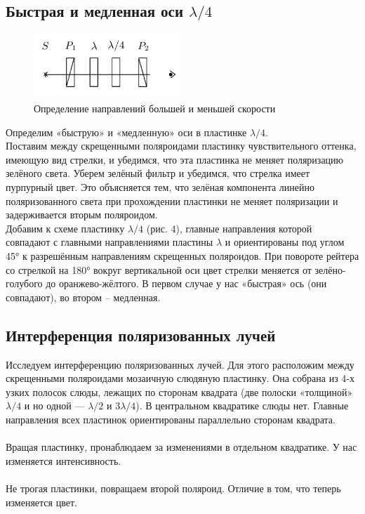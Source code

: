 \documentclass[a4paper,12pt]{article} %
\begin{document}
\subsection{Быстрая и медленная оси $ \lambda / 4 $}
\begin{figure}
	\includegraphics[width=5.5cm]{4.png}
	\caption{Определение направлений большей и меньшей скорости}
	\label{pic:4}
\end{figure}
Определим «быструю» и «медленную» оси в пластинке $ \lambda / 4 $.
\\
Поставим между скрещенными поляроидами пластинку чувствительного оттенка, имеющую вид стрелки, и убедимся, что эта пластинка не меняет поляризацию зелёного света. Уберем зелёный фильтр и убедимся, что стрелка имеет пурпурный цвет. Это объясняется тем, что зелёная компонента линейно поляризованного света при прохождении пластинки не меняет поляризации и задерживается вторым поляроидом.
\\
Добавим к схеме пластинку $ \lambda / 4 $ (рис. 4), главные направления которой совпадают с главными направлениями пластины $ \lambda $ и ориентированы под углом 45° к разрешённым направлениям скрещенных поляроидов. При повороте рейтера со стрелкой на 180° вокруг вертикальной оси цвет стрелки меняется от зелёно-голубого до оранжево-жёлтого. В первом случае у нас «быстрая» ось (они совпадают), во втором -- медленная.

\subsection{Интерференция поляризованных лучей}
Исследуем интерференцию поляризованных лучей. Для этого расположим между скрещенными поляроидами мозаичную слюдяную пластинку. Она собрана из 4-х узких полосок слюды, лежащих по сторонам квадрата (две полоски «толщиной» $ \lambda / 4 $ и но одной — $ \lambda / 2 $ и $ 3 \lambda / 4 $). В центральном квадратике слюды нет. Главные направления всех пластинок ориентированы параллельно сторонам квадрата.
\\\\
Вращая пластинку, пронаблюдаем за изменениями в отдельном квадратике. У нас изменяется интенсивность.
\\\\
Не трогая пластинки, повращаем второй поляроид. Отличие в том, что теперь изменяется цвет.
\end{document}
